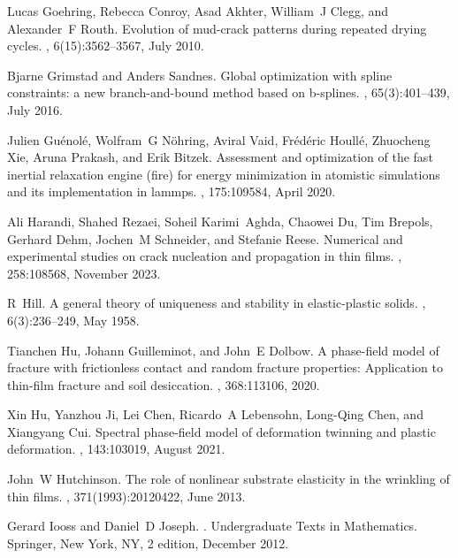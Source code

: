 \documentclass[10pt]{article}
\begin{document}
\begin{thebibliography}{10}
Lucas Goehring, Rebecca Conroy, Asad Akhter, William~J Clegg, and Alexander~F Routh.
\newblock Evolution of mud-crack patterns during repeated drying cycles.
, 6(15):3562--3567, July 2010.

Bjarne Grimstad and Anders Sandnes.
\newblock Global optimization with spline constraints: a new branch-and-bound method based on b-splines.
, 65(3):401--439, July 2016.

Julien Gu{\'e}nol{\'e}, Wolfram~G N{\"o}hring, Aviral Vaid, Fr{\'e}d{\'e}ric Houll{\'e}, Zhuocheng Xie, Aruna Prakash, and Erik Bitzek.
\newblock Assessment and optimization of the fast inertial relaxation engine (fire) for energy minimization in atomistic simulations and its implementation in lammps.
, 175:109584, April 2020.

Ali Harandi, Shahed Rezaei, Soheil Karimi~Aghda, Chaowei Du, Tim Brepols, Gerhard Dehm, Jochen~M Schneider, and Stefanie Reese.
\newblock Numerical and experimental studies on crack nucleation and propagation in thin films.
, 258:108568, November 2023.

R~Hill.
\newblock A general theory of uniqueness and stability in elastic-plastic solids.
, 6(3):236--249, May 1958.

Tianchen Hu, Johann Guilleminot, and John~E Dolbow.
\newblock A phase-field model of fracture with frictionless contact and random fracture properties: Application to thin-film fracture and soil desiccation.
, 368:113106, 2020.

Xin Hu, Yanzhou Ji, Lei Chen, Ricardo~A Lebensohn, Long-Qing Chen, and Xiangyang Cui.
\newblock Spectral phase-field model of deformation twinning and plastic deformation.
, 143:103019, August 2021.

John~W Hutchinson.
\newblock The role of nonlinear substrate elasticity in the wrinkling of thin films.
, 371(1993):20120422, June 2013.

Gerard Iooss and Daniel~D Joseph.
.
\newblock Undergraduate Texts in Mathematics. Springer, New York, NY, 2 edition, December 2012.


\end{thebibliography}
\end{document}
